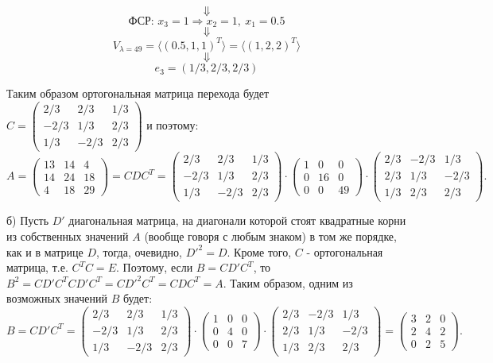 \documentclass{article}
\begin{document}
$$\Downarrow$$
$$\textrm{ФСР: } x_3=1\Rightarrow x_2=1,\ x_1=0.5$$
$$\Downarrow$$
$$V_{\lambda=49}=\langle (0.5, 1, 1)^T \rangle=\langle (1, 2, 2)^T \rangle$$
$$\Downarrow$$
$$e_3=(1/3, 2/3, 2/3)$$
\par
Таким образом ортогональная матрица перехода будет $C=\left(\begin{array}{rrr}2/3 & 2/3 & 1/3\\-2/3 & 1/3 & 2/3\\1/3 & -2/3 & 2/3\end{array}\right)$ и поэтому:
$$A=\left(\begin{array}{rrr}13 & 14 & 4\\14 & 24 & 18\\4 & 18 & 29\end{array}\right)=CDC^T=\left(\begin{array}{rrr}2/3 & 2/3 & 1/3\\-2/3 & 1/3 & 2/3\\1/3 & -2/3 & 2/3\end{array}\right)\cdot\left(\begin{array}{rrr}1 & 0 & 0\\0 & 16 & 0\\0 & 0 & 49\end{array}\right)\cdot\left(\begin{array}{rrr}2/3 & -2/3 & 1/3\\2/3 & 1/3 & -2/3\\1/3 & 2/3 & 2/3\end{array}\right).$$
\par
б) Пусть $D'$ диагональная матрица, на диагонали которой стоят квадратные корни из собственных значений $A$ (вообще говоря с любым знаком) в том же порядке, как и в матрице $D$, тогда, очевидно, $D'^2=D$. Кроме того, $C$ - ортогональная матрица, т.е. $C^TC=E$. Поэтому, если $B=CD'C^T$, то $B^2=CD'C^TCD'C^T=CD'^2C^T=CDC^T=A$.  Таким образом, одним из возможных значений $B$ будет:
$$B=CD'C^T=\left(\begin{array}{rrr}2/3 & 2/3 & 1/3\\-2/3 & 1/3 & 2/3\\1/3 & -2/3 & 2/3\end{array}\right)\cdot\left(\begin{array}{rrr}1 & 0 & 0\\0 & 4 & 0\\0 & 0 & 7\end{array}\right)\cdot\left(\begin{array}{rrr}2/3 & -2/3 & 1/3\\2/3 & 1/3 & -2/3\\1/3 & 2/3 & 2/3\end{array}\right)=\left(\begin{array}{rrr}3 & 2 & 0\\2 & 4 & 2\\0 & 2 & 5\end{array}\right).$$
\end{document}
